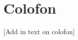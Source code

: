 \documentclass[
]{book}
\begin{document}
\hypertarget{colofon}{%
\chapter{Colofon}\label{colofon}}

{[}Add in text on colofon{]}

  
\end{document}
